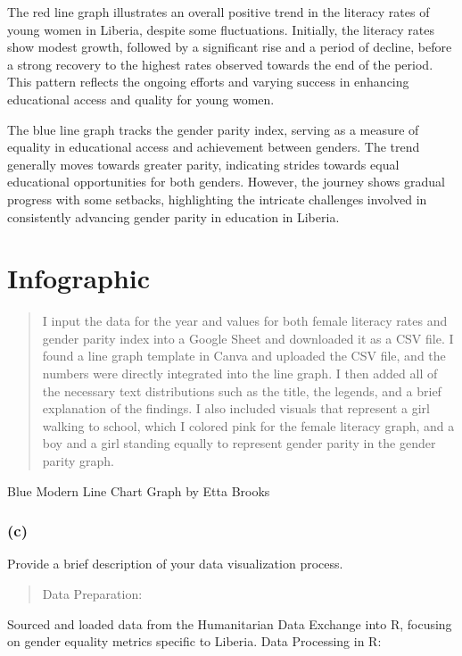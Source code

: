 \documentclass[
]{article}
\begin{document}
The red line graph illustrates an overall positive trend in the literacy
rates of young women in Liberia, despite some fluctuations. Initially,
the literacy rates show modest growth, followed by a significant rise
and a period of decline, before a strong recovery to the highest rates
observed towards the end of the period. This pattern reflects the
ongoing efforts and varying success in enhancing educational access and
quality for young women.

The blue line graph tracks the gender parity index, serving as a measure
of equality in educational access and achievement between genders. The
trend generally moves towards greater parity, indicating strides towards
equal educational opportunities for both genders. However, the journey
shows gradual progress with some setbacks, highlighting the intricate
challenges involved in consistently advancing gender parity in education
in Liberia.

\section{Infographic}\label{infographic}

\begin{quote}
I input the data for the year and values for both female literacy rates
and gender parity index into a Google Sheet and downloaded it as a CSV
file. I found a line graph template in Canva and uploaded the CSV file,
and the numbers were directly integrated into the line graph. I then
added all of the necessary text distributions such as the title, the
legends, and a brief explanation of the findings. I also included
visuals that represent a girl walking to school, which I colored pink
for the female literacy graph, and a boy and a girl standing equally to
represent gender parity in the gender parity graph.
\end{quote}

Blue Modern Line Chart Graph by Etta Brooks

\subsubsection{(c)}\label{c}

Provide a brief description of your data visualization process.

\begin{quote}
Data Preparation:
\end{quote}

Sourced and loaded data from the Humanitarian Data Exchange into R,
focusing on gender equality metrics specific to Liberia. Data Processing
in R:
\end{document}
